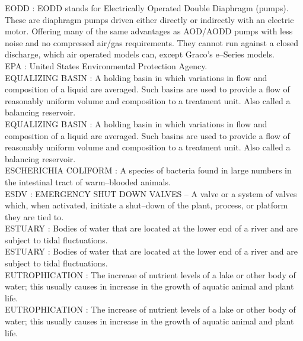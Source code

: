 \vspace{0.15cm}
EODD :   EODD stands for Electrically Operated Double Diaphragm (pumps). These are diaphragm pumps driven either directly or indirectly with an electric motor. Offering many of the same advantages as AOD/AODD pumps with less noise and no compressed air/gas requirements. They cannot run against a closed discharge, which air operated models can, except Graco’s e–Series models.\\
\vspace{0.15cm}
EPA :  United States Environmental Protection Agency. \\
\vspace{0.15cm}
EQUALIZING BASIN :  A holding basin in which variations in flow and composition of a liquid are averaged. Such basins are used to provide a flow of reasonably uniform volume and composition to a treatment unit.  Also called a balancing reservoir.\\
\vspace{0.15cm}
EQUALIZING BASIN :  A holding basin in which variations in flow and composition of a liquid are averaged. Such basins are used to provide a flow of reasonably uniform volume and composition to a treatment unit.  Also called a balancing reservoir.\\
\vspace{0.15cm}
ESCHERICHIA COLIFORM :   A species of bacteria found in large numbers in the intestinal tract of warm–blooded animals.\\
\vspace{0.15cm}
ESDV :  EMERGENCY SHUT DOWN VALVES –  A valve or a system of valves which, when activated, initiate a shut–down of the plant, process, or platform they are tied to.\\
\vspace{0.15cm}
ESTUARY :  Bodies of water that are located at the lower end of a river and are subject to tidal fluctuations.\\
\vspace{0.15cm}
ESTUARY :  Bodies of water that are located at the lower end of a river and are subject to tidal fluctuations.\\
\vspace{0.15cm}
EUTROPHICATION :  The increase of nutrient levels of a lake or other body of water; this usually causes in increase in the growth of aquatic animal and plant life.\\
\vspace{0.15cm}
EUTROPHICATION :  The increase of nutrient levels of a lake or other body of water; this usually causes in increase in the growth of aquatic animal and plant life.\\
